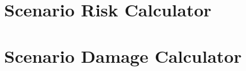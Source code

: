 \section{Scenario Risk Calculator}
   \label{sec:acc-sr}
   
\section{Scenario Damage Calculator}
   \label{sec:acc-sd}
   
%    
%    
%    
